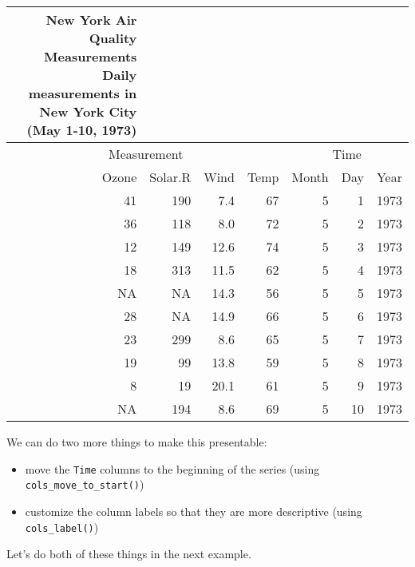 \documentclass[]{article}
\newenvironment{Shaded}{\begin{snugshade}}{\end{snugshade}}
\newcommand{\KeywordTok}[1]{\textcolor[rgb]{0.13,0.29,0.53}{\textbf{#1}}}
\newcommand{\DataTypeTok}[1]{\textcolor[rgb]{0.13,0.29,0.53}{#1}}
\newcommand{\StringTok}[1]{\textcolor[rgb]{0.31,0.60,0.02}{#1}}
\newcommand{\CommentTok}[1]{\textcolor[rgb]{0.56,0.35,0.01}{\textit{#1}}}
\newcommand{\OperatorTok}[1]{\textcolor[rgb]{0.81,0.36,0.00}{\textbf{#1}}}
\newcommand{\NormalTok}[1]{#1}
\providecommand{\tightlist}{%
  \setlength{\itemsep}{0pt}\setlength{\parskip}{0pt}}
\begin{document}
\begin{longtable}{rrrrrrr}
\caption*{
\large New York Air Quality Measurements\\ 
\small Daily measurements in New York City (May 1-10, 1973)\\ 
} \\ 
\toprule
\multicolumn{4}{c}{Measurement} & \multicolumn{3}{c}{Time} \\ 
 \cmidrule(lr){1-4}\cmidrule(lr){5-7}
Ozone & Solar.R & Wind & Temp & Month & Day & Year \\ 
\midrule
41 & 190 & 7.4 & 67 & 5 & 1 & 1973 \\ 
36 & 118 & 8.0 & 72 & 5 & 2 & 1973 \\ 
12 & 149 & 12.6 & 74 & 5 & 3 & 1973 \\ 
18 & 313 & 11.5 & 62 & 5 & 4 & 1973 \\ 
NA & NA & 14.3 & 56 & 5 & 5 & 1973 \\ 
28 & NA & 14.9 & 66 & 5 & 6 & 1973 \\ 
23 & 299 & 8.6 & 65 & 5 & 7 & 1973 \\ 
19 & 99 & 13.8 & 59 & 5 & 8 & 1973 \\ 
8 & 19 & 20.1 & 61 & 5 & 9 & 1973 \\ 
NA & 194 & 8.6 & 69 & 5 & 10 & 1973 \\ 
\bottomrule
\end{longtable}

We can do two more things to make this presentable:

\begin{itemize}
\tightlist
\item
  move the \texttt{Time} columns to the beginning of the series (using
  \texttt{cols\_move\_to\_start()})
\item
  customize the column labels so that they are more descriptive (using
  \texttt{cols\_label()})
\end{itemize}

Let's do both of these things in the next example.

\begin{Shaded}
\end{Shaded}
\end{document}

